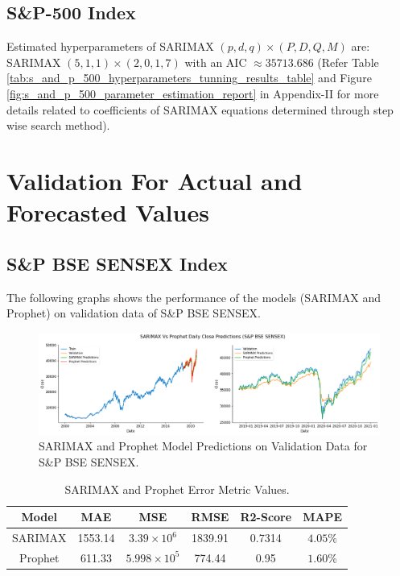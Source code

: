\documentclass[conference]{IEEEtran}
\begin{document}
\subsection{S\&P-500 Index}
Estimated hyperparameters of SARIMAX $(p, d, q) \times (P, D, Q, M)$ are: SARIMAX $(5, 1, 1) \times (2, 0, 1, 7)$ with an AIC $\approx 35713.686$ (Refer Table \ref{tab:s_and_p_500_hyperparameters_tunning_results_table} and Figure \ref{fig:s_and_p_500_parameter_estimation_report} in Appendix-II for more details related to coefficients of SARIMAX equations determined through step wise search method).

\onecolumn
\section{Validation For Actual and Forecasted Values}
\subsection{S\&P BSE SENSEX Index}
The following graphs shows the performance of the models (SARIMAX and Prophet) on validation data of S\&P BSE SENSEX.
\begin{figure}[htbp]
	\centering
	\includegraphics[width = \textwidth]{images/SARIMAX-Prophet-SENSEX-Predictions.png}
	\caption{SARIMAX and Prophet Model Predictions on Validation Data for S\&P BSE SENSEX.}
	\label{fig:sarimax_prophet_results_sensex_index}
\end{figure}

\begin{table}[htbp]
	\setlength{\tabcolsep}{20pt}
	\renewcommand{\arraystretch}{1.2}
	\centering
	\caption{SARIMAX and Prophet Error Metric Values.}
	\begin{tabular}{| c | c | c | c | c | c |}
		\hline
		\textbf{Model} & \textbf{MAE} & \textbf{MSE} & \textbf{RMSE} & \textbf{R2-Score} & \textbf{MAPE} \\
		\hline
		SARIMAX        & 1553.14     & $3.39 \times 10^{6}$ & 1839.91      & 0.7314          & $4.05 \%$     \\
		\hline
		Prophet        & 611.33      & $5.998 \times 10^{5}$ & 774.44       & 0.95             & $1.60\%$      \\
		\hline
	\end{tabular}
	\label{tab:s_and_p_sensex_model_evaluation_metric_table}
\end{table}
\end{document}
